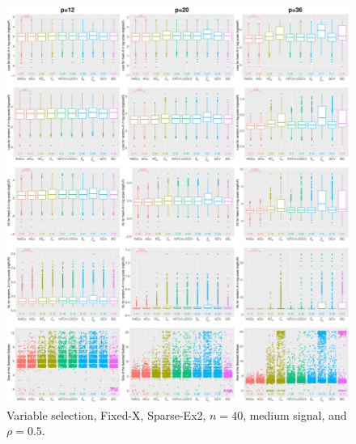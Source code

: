 \begin{figure}[!ht]
\centering
\includegraphics[width=\textwidth]{figures/supplement/fixedx/subset_selection/Sparse-Ex2_n40_msnr_rho05.eps}
\caption{Variable selection, Fixed-X, Sparse-Ex2, $n=40$, medium signal, and $\rho=0.5$.}
\end{figure}
\clearpage
